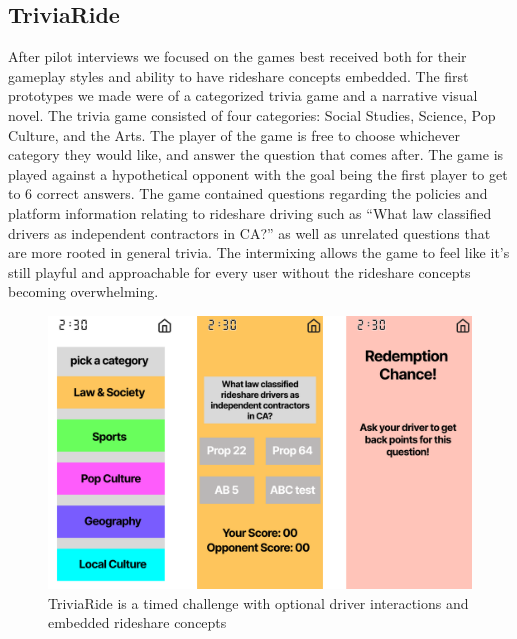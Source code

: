 \subsection{TriviaRide} 
After pilot interviews we focused on the games best received both for their gameplay styles and ability to have rideshare concepts embedded. The first prototypes we made were of a categorized trivia game and a narrative visual novel. The trivia game consisted of four categories: Social Studies, Science, Pop Culture, and the Arts. The player of the game is free to choose whichever category they would like, and answer the question that comes after. The game is played against a hypothetical opponent with the goal being the first player to get to 6 correct answers.
The game contained questions regarding the policies and platform information relating to rideshare driving such as “What law classified drivers as independent contractors in CA?” as well as unrelated questions that are more rooted in general trivia. The intermixing allows the game to feel like it's still playful and approachable for every user without the rideshare concepts becoming overwhelming.

\FloatBarrier
\begin{figure}[h!]
    \centering
\includegraphics[width=.7\linewidth]{Chapters/figures/triviaRide.png}
    \caption{TriviaRide is a timed challenge with optional driver interactions and embedded rideshare concepts}
    \label{crossroad}
\end{figure}
\FloatBarrier

